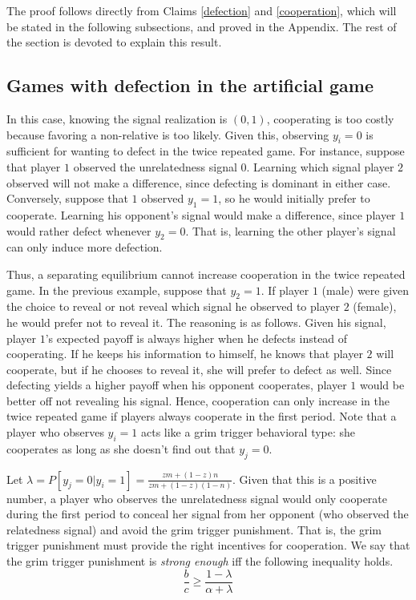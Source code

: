 \documentclass[12pt]{article}
\begin{document}
The proof follows directly from Claims \ref{defection} and \ref{cooperation}, which will be stated in the following subsections, and proved in the Appendix. The rest of the section is devoted to explain this result.

\subsection{Games with defection in the artificial game}\label{defection_ag}

In this case, knowing the signal realization is $(0,1)$, cooperating is too costly because favoring a non-relative is too likely. Given this, observing $y_{i}=0$ is sufficient for wanting to defect in the twice repeated game. For instance, suppose that player $1$ observed the unrelatedness signal $0$. Learning which signal player $2$ observed will not make a difference, since defecting is dominant in either case. Conversely, suppose that $1$ observed $y_{1}=1$, so he would initially prefer to cooperate. Learning his opponent's signal would make a difference, since player $1$ would rather defect whenever $y_{2}=0$. That is, learning the other player's signal can only induce more defection.

Thus, a separating equilibrium cannot increase cooperation in the twice repeated game. In the previous example, suppose that $y_{2}=1$. If player $1$ (male) were given the choice to reveal or not reveal which signal he observed to player $2$ (female), he would prefer not to reveal it. The reasoning is as follows. Given his signal, player $1$'s expected payoff is always higher when he defects instead of cooperating. If he keeps his information to himself, he knows that player $2$ will cooperate, but if he chooses to reveal it, she will prefer to defect as well. Since defecting yields a higher payoff when his opponent cooperates, player $1$ would be better off not revealing his signal. Hence, cooperation can only increase in the twice repeated game if players always cooperate in the first period. Note that a player who observes $y_{i}=1$ acts like a grim trigger behavioral type: she cooperates as long as she doesn't find out that $y_{j}=0$. 

Let $\lambda=P[y_{j}=0|y_{i}=1]=\frac{zm+(1-z)n}{zm+(1-z)(1-n)}$. Given that this is a positive number, a player who observes the unrelatedness signal would only cooperate during the first period to conceal her signal from her opponent (who observed the relatedness signal) and avoid the grim trigger punishment. That is, the grim trigger punishment must provide the right incentives for cooperation. We say that the grim trigger punishment is \textit{strong enough} iff the following inequality holds.
\begin{equation}\label{strong}
 \frac{b}{c} \geq \frac{1-\lambda}{\alpha + \lambda}
\end{equation}
  
\end{document}
